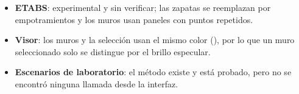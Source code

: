 \begin{itemize}
	      en particular,  se exporta con un material simple y sin eje, cuando el esquema IFC2X3
	      prevé para ese tipo un conjunto de capas de material (verifíquese contra la especificación).
	\item \textbf{ETABS}: experimental y sin verificar; las zapatas se reemplazan por empotramientos y los muros usan
	      paneles con puntos repetidos.
	\item \textbf{Visor}: los muros y la selección usan el mismo color (), por lo que un muro
	      seleccionado solo se distingue por el brillo especular.
	\item \textbf{Escenarios de laboratorio}: el método existe y está probado, pero no se encontró ninguna llamada desde
	      la interfaz.
\end{itemize}
